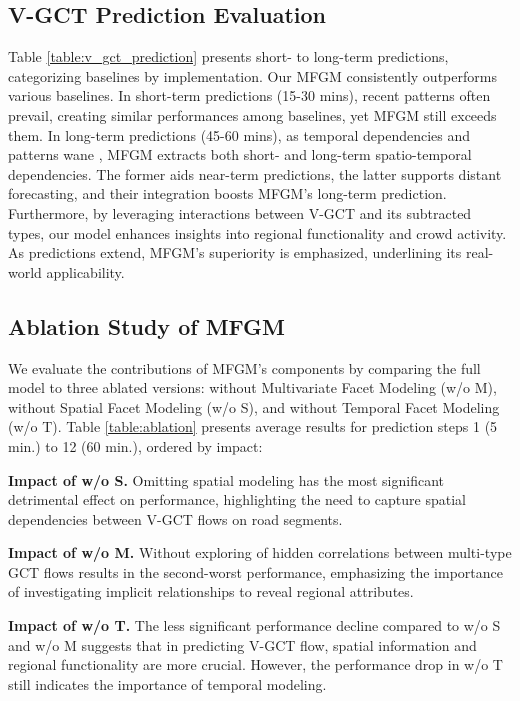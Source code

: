 \documentclass[letterpaper]{article} %
\begin{document}
\subsection{V-GCT Prediction Evaluation}
Table \ref{table:v_gct_prediction} presents short- to long-term predictions, categorizing baselines by implementation. Our MFGM consistently outperforms various baselines. In short-term predictions (15-30 mins), recent patterns often prevail, creating similar performances among baselines, yet MFGM still exceeds them. In long-term predictions (45-60 mins), as temporal dependencies and patterns wane \cite{ye2022learning}, MFGM extracts both short- and long-term spatio-temporal dependencies. The former aids near-term predictions, the latter supports distant forecasting, and their integration boosts MFGM's long-term prediction. Furthermore, by leveraging interactions between V-GCT and its subtracted types, our model enhances insights into regional functionality and crowd activity. As predictions extend, MFGM's superiority is emphasized, underlining its real-world applicability.

\subsection{Ablation Study of MFGM}
We evaluate the contributions of MFGM's components by comparing the full model to three ablated versions: without Multivariate Facet Modeling (w/o M), without Spatial Facet Modeling (w/o S), and without Temporal Facet Modeling (w/o T). Table \ref{table:ablation} presents average results for prediction steps 1 (5 min.) to 12 (60 min.), ordered by impact:

\noindent \textbf{Impact of w/o S.} Omitting spatial modeling has the most significant detrimental effect on performance, highlighting the need to capture spatial dependencies between V-GCT flows on road segments.

\noindent \textbf{Impact of w/o M.} Without exploring of hidden correlations between multi-type GCT flows results in the second-worst performance, emphasizing the importance of investigating implicit relationships to reveal regional attributes.

\noindent \textbf{Impact of w/o T.} The less significant performance decline compared to w/o S and w/o M suggests that in predicting V-GCT flow, spatial information and regional functionality are more crucial. However, the performance drop in w/o T still indicates the importance of temporal modeling.
\end{document}

